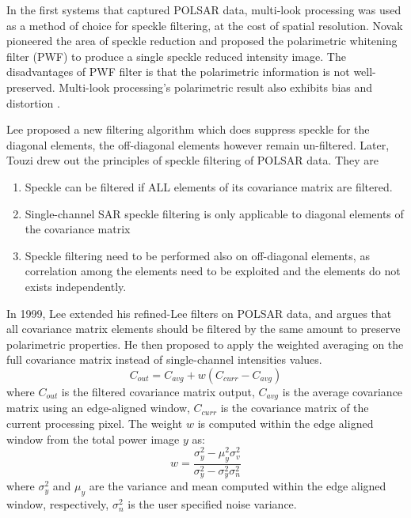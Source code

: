 In the first systems that captured POLSAR data, multi-look processing was used as a method of choice for speckle filtering, at the cost of spatial resolution.
Novak \cite{Novak_1990_TAES} pioneered the area of speckle reduction and proposed the polarimetric whitening filter (PWF) to produce a single speckle reduced intensity image. 
The disadvantages of PWF filter is that the polarimetric information is not well-preserved.
Multi-look processing's polarimetric result also exhibits bias and distortion \cite{Lee_2008_TGRS}.

Lee \cite{Lee_1991_TGRS} proposed a new filtering algorithm which does suppress speckle for the diagonal elements, the off-diagonal elements however remain un-filtered.
Later, Touzi \cite{Touzi_1994_TGRS} drew out the principles of speckle filtering of POLSAR data. 
They are
\begin{enumerate}
	\item Speckle can be filtered if ALL elements of its covariance matrix are filtered.
	\item Single-channel SAR speckle filtering is only applicable to diagonal elements of the covariance matrix
	\item Speckle filtering need to be performed also on off-diagonal elements, as correlation among the elements need to be exploited and the elements do not exists independently.
\end{enumerate}

In 1999, Lee \cite{Lee_1999_TGRS} extended his refined-Lee filters on POLSAR data, and argues that all covariance matrix elements should be filtered by the same amount to preserve polarimetric properties. 
He then proposed to apply the weighted averaging on the full covariance matrix instead of single-channel intensities values. 
\begin{equation}
C_{out} = C_{avg} + w (C_{curr} - C_{avg})
\end{equation}
where
	$C_{out}$ is the filtered covariance matrix output,
	$C_{avg}$ is the average covariance matrix using an edge-aligned window,
	$C_{curr}$ is the covariance matrix of the current processing pixel.
The weight $w$ is computed within the edge aligned window from the total power image $y$ as:
\begin{equation}
w = \frac{\sigma^2_y - \mu^2_y \sigma^2_v}{\sigma^2_y - \sigma^2_y \sigma^2_n}
\end{equation}
where 
	$\sigma^2_y$ and $\mu_y$ are the variance and mean computed within the edge aligned window, respectively,
	$\sigma^2_n$ is the user specified noise variance. 


